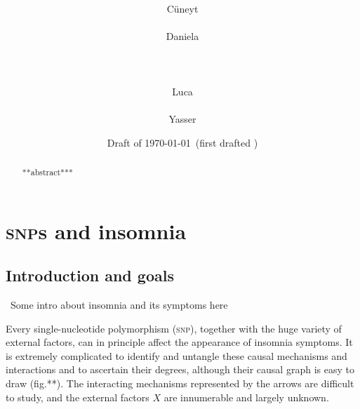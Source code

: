 \documentclass[\ifafour a4paper,12pt,\else a5paper,10pt,\fi%
onecolumn,oneside,article,%
british%
]{memoir}
\title{\propertitle%
}
\author{%
\hspace*{\stretch{1}}%
\parbox{0.5\linewidth}%
{\protect\centering C\"uneyt\\%
\footnotesize\epost{\email{cuneyt.guzey}{ntnu.no}}}%
\hspace*{\stretch{1}}%
\parbox{0.5\linewidth}%
{\protect\centering Daniela\\%
\footnotesize\epost{\email{daniela.bragantini}{ntnu.no}}}%
\hspace*{\stretch{1}}%
\\[\jot]\hspace*{\stretch{1}}%
\parbox{0.5\linewidth}%
{\protect\centering Luca\\%
\footnotesize\epost{\email{piero.mana}{ntnu.no}}}%
\hspace*{\stretch{1}}%
\parbox{0.5\linewidth}%
{\protect\centering Yasser\\%
\footnotesize\epost{\email{yasser.roudi}{ntnu.no}}}%
\hspace*{\stretch{1}}%
}
\date{Draft of \today\ (first drafted \firstdraft)}
\theoremstyle{remark}
\theoremstyle{innote}
\newcommand*{\citep}{\parencites}
\newcommand*{\asudedication}[1]{%
{\par\centering\textit{#1}\par}}
\renewcommand*{\|}{\mathpunct{|}}
\newcommand*{\fig}{fig.}%
\newcommand*{\puzzle}{\maltese}
\newcommand{\mynote}[1]{ {\color{notecolour}\puzzle\ #1}}
\newcommand*{\snp}{\textsc{snp}}
\begin{document}
\captiondelim{\quad}\captionnamefont{\footnotesize}\captiontitlefont{\footnotesize}
\frenchspacing

\maketitle
\ifpublic
\abstractrunin
\abslabeldelim{}
\renewcommand*{\abstractname}{}
\setlength{\absleftindent}{0pt}
\setlength{\absrightindent}{0pt}
\setlength{\abstitleskip}{-\absparindent}
\begin{abstract}%
  \noindent ***abstract***
\end{abstract}\fi

\frenchspacing

\section{\snp s and insomnia}
\label{sec:intro}

\subsection{Introduction and goals}
\label{sec:intro_goals}

\mynote{Some intro about insomnia and its symptoms here}

Every single-nucleotide polymorphism (\snp), together with the huge variety
of external factors, can in principle affect the appearance of insomnia
symptoms. It is extremely complicated to identify and untangle these causal
mechanisms and interactions and to ascertain their degrees, although their
causal graph \citep{pearl2000_r2009} is easy to draw (\fig**). The
interacting mechanisms represented by the arrows are difficult to study,
and the external factors $X$ are innumerable and largely unknown.
\end{document}
